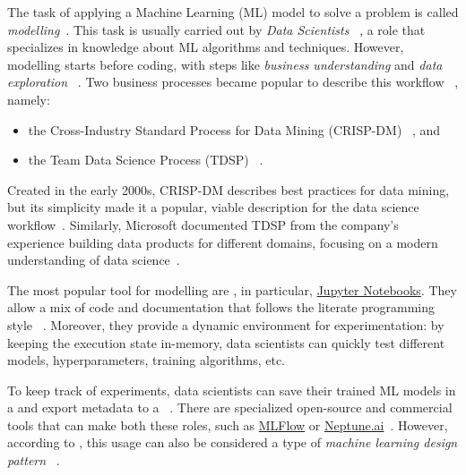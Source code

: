  The task of applying a Machine Learning (ML) model to solve a problem
  is called \emph{modelling}~\parencite{Abu-Mostafa2012LearningData}.
  This task is usually carried out by \emph{Data Scientists}%
  ~\parencite{Kim2018DataChallenges,Nahar2021MoreProjects,
  Wilson2022MachineAction}, a role that specializes in knowledge about
  ML algorithms and techniques. However, modelling starts before coding,
  with steps like \emph{business understanding} and \emph{data exploration}%
  ~\parencite{Microsoft2021TeamDocumentation,Shearer2000TheMining}.
  Two business processes became popular to describe this workflow%
  ~\parencite{Banerjee2017TwoHub,DeSilva2022AnProduction,
  Watanabe2019PreliminaryProcess}, namely:
  \begin{itemize}
    \item the Cross-Industry Standard Process for Data Mining (CRISP-DM)%
          ~\parencite{Shearer2000TheMining,Wirth2000CRISP-DMMining}, and
    \item the Team Data Science Process (TDSP)%
          ~\parencite{Microsoft2021TeamDocumentation,Tab2017WhatDocs}.
  \end{itemize}

  Created in the early 2000s, CRISP-DM describes best practices for data
  mining, but its simplicity made it a popular, viable description for the
  data science workflow~\parencite{Martinez-Plumed2021CRISP-DMTrajectories}. 
  Similarly, Microsoft documented TDSP from the company's experience building
  data products for different domains, focusing on a modern understanding of
  data science~\parencite{Microsoft2021TeamDocumentation}.

  The most popular tool for modelling are ,
  in particular, \href{https://jupyter.org/}{Jupyter Notebooks}. They allow
  a mix of code and documentation that follows the literate programming style%
  ~\parencite{Pimentel2019ANotebooks}. Moreover, they provide a dynamic
  environment for experimentation: by keeping the execution state in-memory,
  data scientists can quickly test different models, hyperparameters,
  training algorithms, etc.
  
  To keep track of experiments, data scientists can save their trained
  ML models in a  and export metadata
  to a %
  ~\parencite{Kreuzberger2023MachineArchitecture,Symeonidis2022MLOpsChallenges, 
  Wazir2023MLOps:Review}. There are specialized open-source and commercial tools
  that can make both these roles, such as \href{https://mlflow.org}{MLFlow} or
  \href{https://neptune.ai}{Neptune.ai}~\parencite{Kreuzberger2023MachineArchitecture}.
  However, according to \citeauthor{Lakshmanan2020MachineMLOps}, this usage
  can also be considered a type of \emph{machine learning design pattern}%
  ~\parencite{Lakshmanan2020MachineMLOps}.

